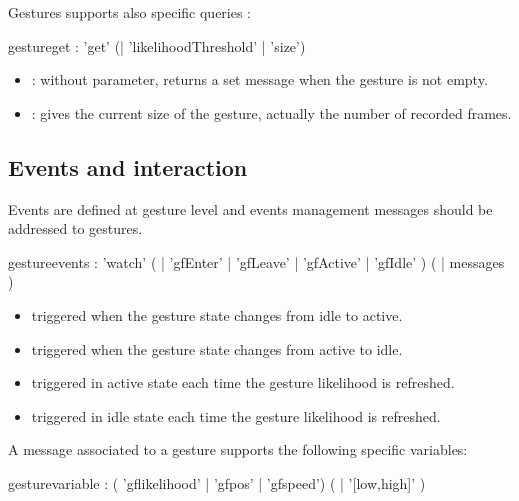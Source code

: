\documentclass[a4paper,twoside]{report}
\newcommand{\subsublevel}[1]	{\subsection{#1}}
\begin{document}
Gestures supports also specific queries :


\begin{rail}
gestureget : 'get' (| 'likelihoodThreshold' | 'size')
\end{rail}

\begin{itemize}
\item {}: without parameter, returns a set message when the gesture is not empty.
\item {}: gives the current size of the gesture, actually the number of recorded frames. 
\end{itemize}


\subsublevel{Events and interaction}
\label{gfevents}

Events are defined at gesture level and events management messages should be addressed to gestures. 


\begin{rail}
gestureevents :
		  	'watch' ( | 'gfEnter' | 'gfLeave' | 'gfActive' | 'gfIdle' )  (  |  messages )
\end{rail}

\begin{itemize}
\item {} triggered when the gesture state changes from idle to active.
\item {} triggered when the gesture state changes from active to idle.
\item {} triggered in active state each time the gesture likelihood is refreshed.
\item {} triggered in idle state each time the gesture likelihood is refreshed.
\end{itemize}

A message associated to a gesture supports the following specific variables:


\begin{rail}
gesturevariable : 
		( 'gflikelihood'
		| 'gfpos'
		| 'gfspeed') ( | '[low,high]' ) 
\end{rail}
\end{document}
